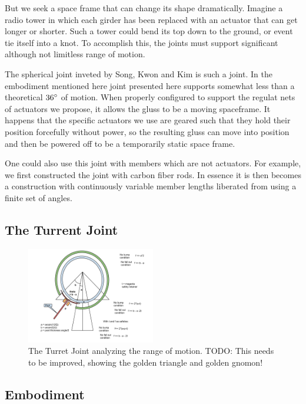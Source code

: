 \documentclass[12pt]{article}
\begin{document}
But we seek a space frame that can change its shape dramatically. Imagine a radio tower in which
each girder has been replaced with an actuator that can get longer or shorter. Such a tower could
bend its top down to the ground, or event
tie itself into a knot. To accomplish this, the joints must support significant although not
limitless range of motion. 

The spherical joint inveted by Song, Kwon and Kim \cite{song2003spherical} is such a joint.
In the embodiment mentioned here joint presented here supports somewhat less than a theoretical
$36\degree$ of motion.
When properly configured to support the regulat nets of actuators we propose,
it allows the gluss to be a moving spaceframe. It happens that the specific actuators we use
are geared such that they hold their position forcefully without power, so the resulting gluss
can move into position and then be powered off to be a temporarily static space frame.

One could also use this joint with members which are not actuators. For example, we first
constructed the joint with carbon fiber rods. In essence it is then becomes a construction with continuously
variable member lengths liberated from using a finite set of angles.

\subsection{The Turrent Joint}


\begin{figure}[!ht]
  \centering
    \includegraphics[width=0.5\textwidth]{TurretJointMath.png}
    \caption[TurretJointMath]{The Turret Joint analyzing the range of motion. TODO: This needs to be improved, showing the golden triangle and golden gnomon!}
      \label{TurretJointMath}
\end{figure}


\subsection{Embodiment}
\end{document}
